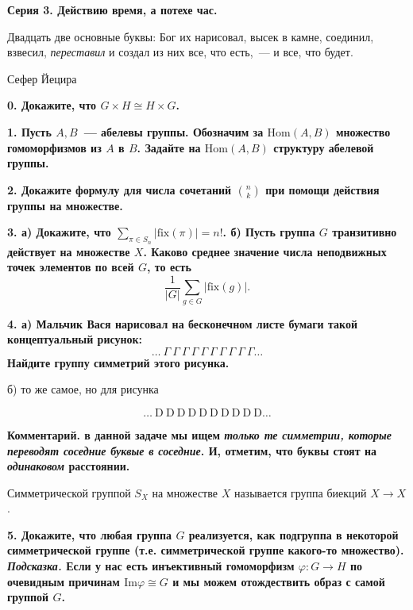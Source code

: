 \documentclass[10pt]{article}
\begin{document}
	\begin{landscape}

	\pagestyle{empty}
	\begin{multicols}{2}

	\centerline{\bf{Серия 3. Действию время, а потехе час. }}

	\epigraph{Двадцать две основные буквы: Бог их нарисовал, высек в камне, соединил, взвесил, \emph{переставил} и создал из них все, что есть,~--- и все, что будет.}{Сефер Йецира}

	\bf{0.} Докажите, что $G \times H \cong H \times G$.

	\bf{1.} Пусть $A, B$~--- абелевы группы. Обозначим за $\mathrm{Hom}(A, B)$ множество гомоморфизмов из $A$ в $B$. Задайте на $\mathrm{Hom}(A, B)$ структуру абелевой группы. 

	\bf{2.} Докажите формулу для числа сочетаний $\binom{n}{k}$ при помощи действия группы на множестве. 

	\bf{3.} а) Докажите, что $\sum_{\pi \in S_n} |\mathrm{fix}(\pi)| = n!$. б) Пусть группа $G$ транзитивно действует на множестве $X$. Каково среднее значение числа неподвижных точек элементов по всей $G$, то есть 
	\[
		\frac{1}{|G|}\sum_{g \in G} |\mathrm{fix}(g)|. 
	\]


	\bf{4.} а) Мальчик Вася нарисовал на бесконечном листе бумаги такой концептуальный рисунок: 
	\[
		\ldots \ \Gamma \ \Gamma \ \Gamma \ \Gamma \ \Gamma \ \Gamma \ \Gamma \ \Gamma \ \Gamma \ \Gamma \ldots
	\]
	Найдите группу симметрий этого рисунка. 

	б) то же самое, но для рисунка 

	\[
		\ldots \ \mathrm{D} \ \mathrm{D} \ \mathrm{D} \ \mathrm{D} \ \mathrm{D}\ \mathrm{D} \ \mathrm{D} \ \mathrm{D} \ \mathrm{D} \ \mathrm{D}\ldots
	\]

	\noindent\bf{Комментарий.} в данной задаче мы ищем \emph{только те симметрии, которые переводят соседние буквые в соседние}. И, отметим, что буквы стоят на \emph{одинаковом} расстоянии. 

	\begin{definition} 
		Симметрической группой $S_{X}$ на множестве $X$ называется группа биекций $X \to X$.
	\end{definition}

	\bf{5.} Докажите, что любая группа $G$ реализуется, как подгруппа в некоторой симметрической группе (т.е. симметрической группе какого-то множество). \emph{Подсказка.} Если у нас есть инъективный гомоморфизм $\varphi\colon G \to H$ по очевидным причинам $\mathrm{Im}{\varphi} \cong G$ и мы можем отождествить образ с самой группой $G$. 


\end{multicols}
\end{landscape}
\end{document}
